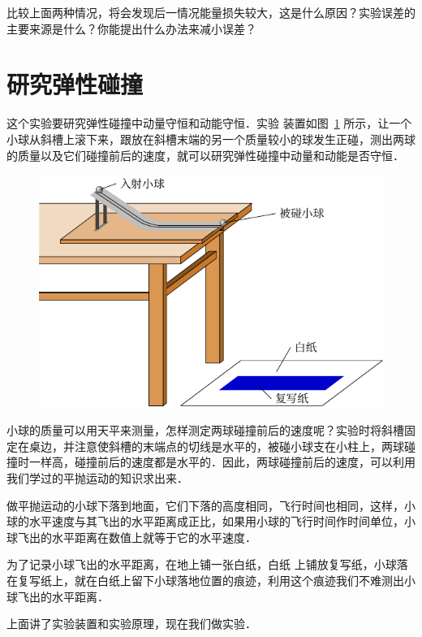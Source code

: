 比较上面两种情况，将会发现后一情况能量损失较大，这是什么原因？实验误差的主要来源是什么？你能提出什么办法来减小误差？

\section{研究弹性碰撞}
这个实验要研究弹性碰撞中动量守恒和动能守恒．实验
装置如图~\ref{fig_A_10-18} 所示，让一个小球从斜槽上滚下来，跟放在斜槽末端的另一个质量较小的球发生正碰，测出两球的质量以及它们碰撞前后的速度，就可以研究弹性碰撞中动量和动能是否守恒．
\begin{figure}[htbp]
    \centering
    \includegraphics{fig/A/10-18.pdf}
    \caption{}\label{fig_A_10-18}
\end{figure}

小球的质量可以用天平来测量，怎样测定两球碰撞前后的速度呢？实验时将斜槽固定在桌边，并注意使斜槽的末端点的切线是水平的，被碰小球支在小柱上，两球碰撞时一样高，碰撞前后的速度都是水平的．因此，两球碰撞前后的速度，可以利用我们学过的平抛运动的知识求出来．

做平抛运动的小球下落到地面，它们下落的高度相同，飞行时间也相同，这样，小球的水平速度与其飞出的水平距离成正比，如果用小球的飞行时间作时间单位，小球飞出的水平距离在数值上就等于它的水平速度．

为了记录小球飞出的水平距离，在地上铺一张白纸，白纸
上铺放复写纸，小球落在复写纸上，就在白纸上留下小球落地位置的痕迹，利用这个痕迹我们不难测出小球飞出的水平距离．

上面讲了实验装置和实验原理，现在我们做实验．

